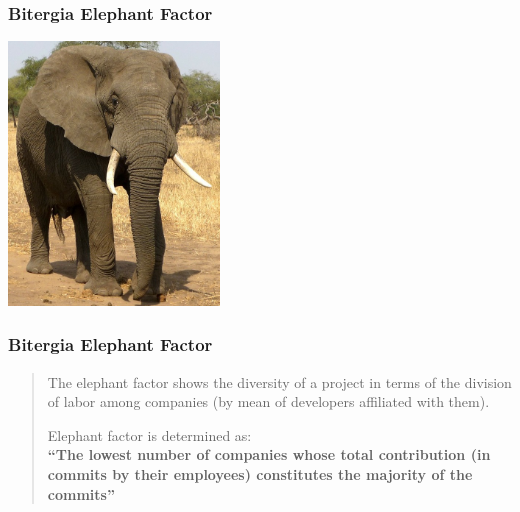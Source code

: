 \documentclass[17pt,aspectratio=169,hyperref=pdfusetitle]{beamer}
\begin{document}
\begin{frame}
\frametitle{Bitergia Elephant Factor}

\begin{center}
\includegraphics[height=7cm]{figs/elephant}
\end{center}

\end{frame}


\begin{frame}
\frametitle{Bitergia Elephant Factor}

{\small
\begin{quote}
The elephant factor shows the diversity of a project in terms of the division of labor among companies (by mean of developers affiliated with them).

  \vspace{.2cm}
  Elephant factor is determined as:\\
  {\bf ``The lowest number of companies whose total contribution (in commits by their employees) constitutes the majority of the commits''} \\
\end{quote}
}
\end{frame}
\end{document}
